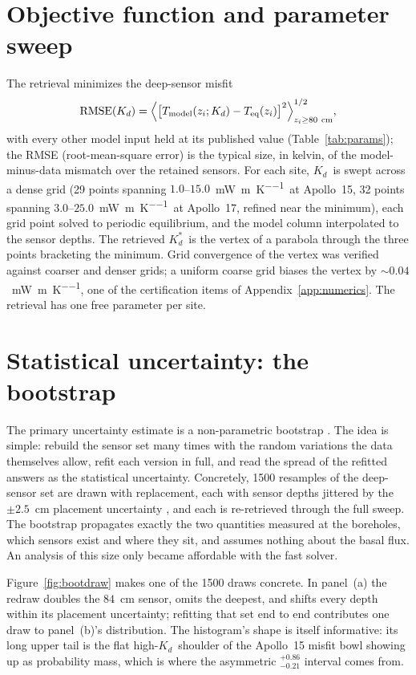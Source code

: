 \documentclass[11pt,a4paper,oneside]{report}
\newcommand{\Kd}{\ensuremath{K_d}}
\newcommand{\Kds}{\ensuremath{K_d^{*}}}
\newcommand{\mWmK}{\si{\milli\watt\per\meter\per\kelvin}}
\begin{document}
\section{Objective function and parameter sweep}\label{sec:sweep-method}
The retrieval minimizes the deep-sensor misfit
\begin{equation}
  \mathrm{RMSE}(\Kd) = \Bigl\langle\bigl[T_{\rm model}(z_i;\Kd)
    - T_{\rm eq}(z_i)\bigr]^2\Bigr\rangle_{z_i\ge 80~\mathrm{cm}}^{1/2},
  \label{eq:rmse}
\end{equation}
with every other model input held at its published value
(Table~\ref{tab:params}); the RMSE (root-mean-square error) is the
typical size, in kelvin, of the model-minus-data mismatch over the
retained sensors. For each site, \Kd\ is swept across a dense
grid (29 points spanning $1.0$--$15.0$~\mWmK\ at Apollo~15, 32 points
spanning $3.0$--$25.0$~\mWmK\ at Apollo~17, refined near the minimum),
each grid point solved to periodic equilibrium, and the model column
interpolated to the sensor depths. The retrieved \Kds\ is the vertex
of a parabola through the three points bracketing the minimum. Grid
convergence of the vertex was verified against coarser and denser
grids; a uniform coarse grid biases the vertex by ${\sim}0.04$~\mWmK,
one of the certification items of Appendix~\ref{app:numerics}. The
retrieval has one free parameter per site.

\section{Statistical uncertainty: the bootstrap}\label{sec:bootstrap}
The primary uncertainty estimate is a non-parametric bootstrap
\citep{efron1993,press2007}. The idea is simple: rebuild the sensor
set many times with the random variations the data themselves allow,
refit each version in full, and read the spread of the refitted
answers as the statistical uncertainty. Concretely, 1500 resamples of
the deep-sensor set are drawn with replacement, each with sensor
depths jittered by the $\pm2.5$~cm placement uncertainty
\citep{nagihara2018}, and each is re-retrieved through the full
sweep. The bootstrap propagates exactly
the two quantities measured at the boreholes, which sensors exist and
where they sit, and assumes nothing about the basal flux. An analysis
of this size only became affordable with the fast solver.

Figure~\ref{fig:bootdraw} makes one of the 1500 draws concrete. In
panel~(a) the redraw doubles the $84$~cm sensor, omits the deepest,
and shifts every depth within its placement uncertainty; refitting
that set end to end contributes one draw to panel~(b)'s distribution.
The histogram's shape is itself informative: its long upper tail is
the flat high-\Kd\ shoulder of the Apollo~15 misfit bowl showing up
as probability mass, which is where the asymmetric
$^{+0.86}_{-0.21}$ interval comes from.
\end{document}
